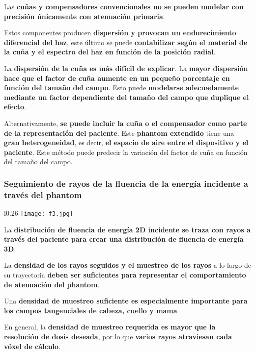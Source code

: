 \documentclass[aspectratio=169,xcolor=dvipsnames,t]{beamer}
\begin{document}
\begin{frame}

    Las \textbf{cuñas y compensadores convencionales no se pueden modelar con precisión únicamente con atenuación primaria}.

    Estos componentes producen \textbf{dispersión y provocan un endurecimiento diferencial del haz}, este último se puede \textbf{contabilizar según el material de la cuña y el espectro del haz en función de la posición radial}. 

    La \textbf{dispersión de la cuña es más difícil de explicar}. La \textbf{mayor dispersión hace que el factor de cuña aumente en un pequeño porcentaje en función del tamaño del campo}. Esto puede \textbf{modelarse adecuadamente mediante un factor dependiente del tamaño del campo que duplique el efecto}.
    
    Alternativamente, \textbf{se puede incluir la cuña o el compensador como parte de la representación del paciente}. Este \textbf{phantom extendido} tiene una \textbf{gran heterogeneidad}, es decir, \textbf{el espacio de aire entre el dispositivo y el paciente}. Este método puede predecir la variación del factor de cuña en función del tamaño del campo.

\end{frame}

\begin{frame}

    \frametitle{Seguimiento de rayos de la fluencia de la energía incidente a través del phantom}

    \begin{wrapfigure}{l}{0.26\textwidth}
        \centering
        \texttt{[image: f3.jpg]}
    \end{wrapfigure}

    La \textbf{distribución de fluencia de energía 2D incidente se traza con rayos a través del paciente para crear una distribución de fluencia de energía 3D}.

    La \textbf{densidad de los rayos seguidos y el muestreo de los rayos} a lo largo de su trayectoria \textbf{deben ser suficientes para representar el comportamiento de atenuación del phantom}. 
    
    Una \textbf{densidad de muestreo suficiente es especialmente importante para los campos tangenciales de cabeza, cuello y mama}. 
    
    En general, la \textbf{densidad de muestreo requerida es mayor que la resolución de dosis deseada}, por lo que \textbf{varios rayos atraviesan cada vóxel de cálculo}.

\end{frame}
\end{document}
